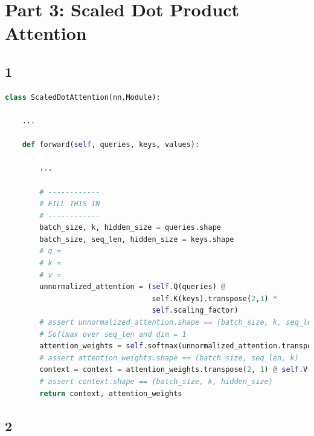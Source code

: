 \documentclass{article}
\begin{document}
\pagebreak
\section*{Part 3: Scaled Dot Product Attention}

\subsection*{1}

\begin{lstlisting}[language=Python]
class ScaledDotAttention(nn.Module):

	...

    def forward(self, queries, keys, values):

    	...

        # ------------
        # FILL THIS IN
        # ------------
        batch_size, k, hidden_size = queries.shape
        batch_size, seq_len, hidden_size = keys.shape
        # q = 
        # k = 
        # v = 
        unnormalized_attention = (self.Q(queries) @ 
                                  self.K(keys).transpose(2,1) * 
                                  self.scaling_factor)
        # assert unnormalized_attention.shape == (batch_size, k, seq_len)
        # Softmax over seq_len and dim = 1
        attention_weights = self.softmax(unnormalized_attention.transpose(2,1))
        # assert attention_weights.shape == (batch_size, seq_len, k)
        context = context = attention_weights.transpose(2, 1) @ self.V(values)
        # assert context.shape == (batch_size, k, hidden_size)
        return context, attention_weights


\end{lstlisting}


\subsection*{2}
\end{document}
